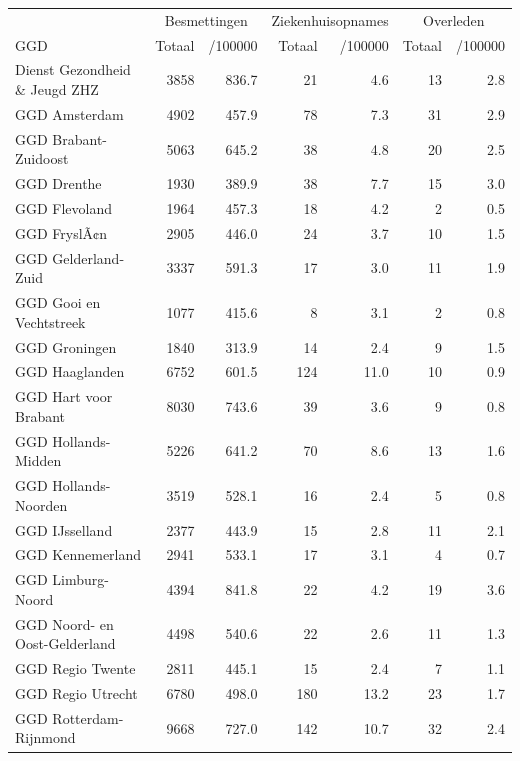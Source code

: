 \documentclass[
  english,
  man,floatsintext]{apa6}
\begin{document}
\begin{table}
\centering\begingroup\fontsize{10}{12}\selectfont

\begin{threeparttable}
\begin{tabular}{lrrrrrr}
\toprule
\multicolumn{1}{c}{ } & \multicolumn{2}{c}{Besmettingen} & \multicolumn{2}{c}{Ziekenhuisopnames} & \multicolumn{2}{c}{Overleden} \\
\cmidrule(l{3pt}r{3pt}){2-3} \cmidrule(l{3pt}r{3pt}){4-5} \cmidrule(l{3pt}r{3pt}){6-7}
GGD & Totaal & /100000 & Totaal & /100000 & Totaal & /100000\\
\midrule
Dienst Gezondheid \& Jeugd ZHZ & 3858 & 836.7 & 21 & 4.6 & 13 & 2.8\\
GGD Amsterdam & 4902 & 457.9 & 78 & 7.3 & 31 & 2.9\\
GGD Brabant-Zuidoost & 5063 & 645.2 & 38 & 4.8 & 20 & 2.5\\
GGD Drenthe & 1930 & 389.9 & 38 & 7.7 & 15 & 3.0\\
GGD Flevoland & 1964 & 457.3 & 18 & 4.2 & 2 & 0.5\\
GGD FryslÃ¢n & 2905 & 446.0 & 24 & 3.7 & 10 & 1.5\\
GGD Gelderland-Zuid & 3337 & 591.3 & 17 & 3.0 & 11 & 1.9\\
GGD Gooi en Vechtstreek & 1077 & 415.6 & 8 & 3.1 & 2 & 0.8\\
GGD Groningen & 1840 & 313.9 & 14 & 2.4 & 9 & 1.5\\
GGD Haaglanden & 6752 & 601.5 & 124 & 11.0 & 10 & 0.9\\
GGD Hart voor Brabant & 8030 & 743.6 & 39 & 3.6 & 9 & 0.8\\
GGD Hollands-Midden & 5226 & 641.2 & 70 & 8.6 & 13 & 1.6\\
GGD Hollands-Noorden & 3519 & 528.1 & 16 & 2.4 & 5 & 0.8\\
GGD IJsselland & 2377 & 443.9 & 15 & 2.8 & 11 & 2.1\\
GGD Kennemerland & 2941 & 533.1 & 17 & 3.1 & 4 & 0.7\\
GGD Limburg-Noord & 4394 & 841.8 & 22 & 4.2 & 19 & 3.6\\
GGD Noord- en Oost-Gelderland & 4498 & 540.6 & 22 & 2.6 & 11 & 1.3\\
GGD Regio Twente & 2811 & 445.1 & 15 & 2.4 & 7 & 1.1\\
GGD Regio Utrecht & 6780 & 498.0 & 180 & 13.2 & 23 & 1.7\\
GGD Rotterdam-Rijnmond & 9668 & 727.0 & 142 & 10.7 & 32 & 2.4\\

\end{tabular}
\end{threeparttable}
\end{table}
\end{document}
